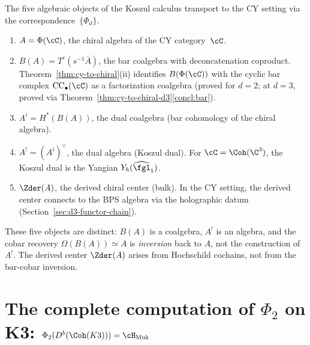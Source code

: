 \begin{remark}
\label{rem:v3-five-objects-cy}
The five algebraic objects of the Koszul calculus transport to the CY setting via the correspondence~$\{\Phi_d\}$.
\begin{enumerate}[label=\textup{(\roman*)}]
 \item $A = \Phi(\cC)$, the chiral algebra of the CY category~$\cC$.
 \item $B(A) = T^c(s^{-1}\bar{A})$, the bar coalgebra with deconcatenation coproduct. Theorem~\textup{\ref{thm:cy-to-chiral}}(ii) identifies $B(\Phi(\cC))$ with the cyclic bar complex $\mathrm{CC}_\bullet(\cC)$ as a factorization coalgebra (proved for $d = 2$; at $d = 3$, proved via Theorem~\textup{\ref{thm:cy-to-chiral-d3}}\ref{concl:bar}).
 \item $A^i = H^*(B(A))$, the dual coalgebra (bar cohomology of the chiral algebra).
 \item $A^! = (A^i)^\vee$, the dual algebra (Koszul dual). For $\cC = \Coh(\C^3)$, the Koszul dual is the Yangian $Y_\hbar(\widehat{\fgl}_1)$.
 \item $\Zder(A)$, the derived chiral center (bulk). In the CY setting, the derived center connects to the BPS algebra via the holographic datum (Section~\ref{sec:d3-functor-chain}).
\end{enumerate}
These five objects are distinct: $B(A)$ is a coalgebra, $A^!$ is an
algebra, and the cobar recovery $\Omega(B(A)) \simeq A$ is
\emph{inversion} back to $A$, not the construction of $A^!$. The derived
center $\Zder(A)$ arises from Hochschild cochains, not from the
bar-cobar inversion.
\end{remark}


\section{The complete computation of \texorpdfstring{$\Phi_2$}{Phi-2} on K3: \texorpdfstring{$\Phi_2(D^b(\Coh(K3))) = \cH_{\mathrm{Muk}}$}{Phi-2(D-b(Coh(K3))) = H-Muk}}
\label{sec:phi2-k3-complete-computation}

